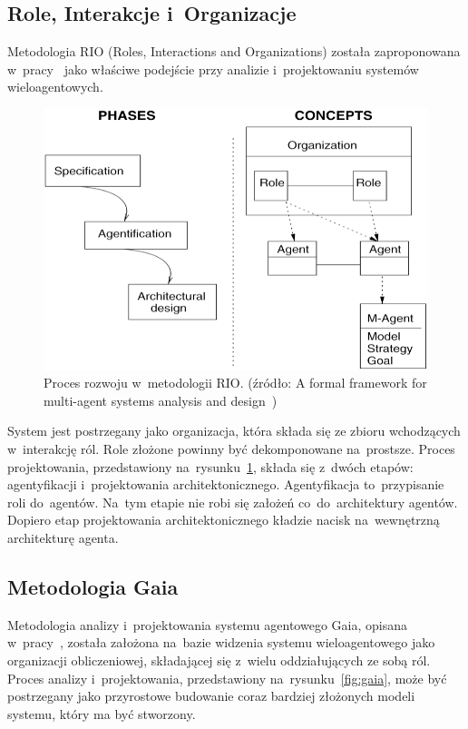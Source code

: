 \documentclass[11pt]{report}
\begin{document}
    \subsection{Role, Interakcje i~Organizacje}
    Metodologia RIO (Roles, Interactions and Organizations) została zaproponowana w~pracy~\cite{S095741740200070220020101} jako właściwe podejście przy analizie
    i~projektowaniu systemów wieloagentowych.

    \begin{figure}[!ht]
        \centering
        \includegraphics[width=\linewidth]{fig/RIO approach.png}
        \caption{Proces rozwoju w~metodologii RIO. (źródło: A formal framework for multi-agent systems analysis and design~\cite{S095741740200070220020101})}
        \label{fig:rio}
    \end{figure}

    System jest postrzegany jako organizacja, która składa się ze zbioru wchodzących w~interakcję ról.
    Role złożone powinny być dekomponowane na~prostsze.
    Proces projektowania, przedstawiony na~rysunku~\ref{fig:rio}, składa się z~dwóch etapów: agentyfikacji i~projektowania architektonicznego.
    Agentyfikacja to~przypisanie roli do~agentów.
    Na~tym etapie nie robi się założeń co~do~architektury agentów.
    Dopiero etap projektowania architektonicznego kładzie nacisk na~wewnętrzną architekturę agenta.

    \subsection{Metodologia Gaia}
    Metodologia analizy i~projektowania systemu agentowego Gaia, opisana w~pracy~\cite{Wooldridge2000a},
    została założona na~bazie widzenia systemu wieloagentowego jako organizacji obliczeniowej, składającej się z~wielu oddziałujących ze sobą ról.
    Proces analizy i~projektowania, przedstawiony na~rysunku~\ref{fig:gaia}, może być postrzegany
    jako przyrostowe budowanie coraz bardziej złożonych modeli systemu, który ma być stworzony.
\end{document}

